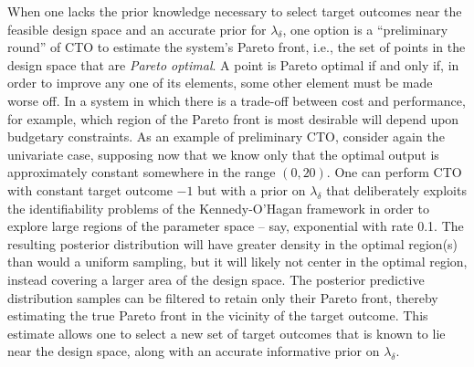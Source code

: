 \documentclass[12pt]{article}
\begin{document}
%
When one lacks the prior knowledge necessary to select target outcomes near the feasible design space and an accurate prior for $\lambda_\delta$, one option is a ``preliminary round'' of CTO to estimate the system's Pareto front, i.e., the set of points in the design space that are {\em Pareto optimal}.
%
A point is Pareto optimal if and only if, in order to improve any one of its elements, some other element must be made worse off.
%
%
In a system in which there is a trade-off between cost and performance, for example, which region of the Pareto front is most desirable will depend upon budgetary constraints.
%
As an example of preliminary CTO, consider again the univariate case, supposing now that we know only that the optimal output is approximately constant somewhere in the range $(0,20)$. 
%
%
%
%
One can perform CTO with constant target outcome $-1$ but with a prior on $\lambda_\delta$ that deliberately exploits the identifiability problems of the Kennedy-O'Hagan framework in order to explore large regions of the parameter space -- say, exponential with rate 0.1.
% 
The resulting posterior distribution will have greater density in the optimal region(s) than would a uniform sampling, but it will likely not center in the optimal region, instead covering a larger area of the design space.
The posterior predictive distribution samples can be filtered to retain only their Pareto front, thereby estimating the true Pareto front in the vicinity of the target outcome.
%
%
This estimate allows one to select a new set of target outcomes that is known to lie near the design space, along with an accurate informative prior on $\lambda_\delta$.
\end{document}
